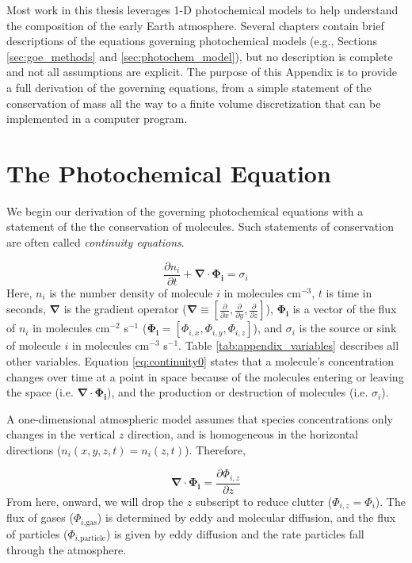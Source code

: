 
Most work in this thesis leverages 1-D photochemical models to help understand the composition of the early Earth atmosphere. Several chapters contain brief descriptions of the equations governing photochemical models (e.g., Sections \ref{sec:goe_methods} and \ref{sec:photochem_model}), but no description is complete and not all assumptions are explicit. The purpose of this Appendix is to provide a full derivation of the governing equations, from a simple statement of the conservation of mass all the way to a finite volume discretization that can be implemented in a computer program.

\section{The Photochemical Equation} \label{sec:photochem_eqn}

We begin our derivation of the governing photochemical equations with a statement of the the conservation of molecules. Such statements of conservation are often called \emph{continuity equations}.

\begin{equation} \label{eq:continuity0}
  \frac{\partial n_{i}}{\partial t} + \bm{\nabla} \cdot \bm{\Phi_{i}} = \sigma_i
\end{equation}
Here, $n_i$ is the number density of molecule $i$ in molecules cm$^{-3}$, $t$ is time in seconds, $\bm{\nabla}$ is the gradient operator ($\bm{\nabla} \equiv [\frac{\partial}{\partial x}, \frac{\partial}{\partial y}, \frac{\partial}{\partial z}]$), $\bm{\Phi_{i}}$ is a vector of the flux of $n_i$ in molecules cm$^{-2}$ s$^{-1}$ ($\bm{\Phi_{i}} = [\Phi_{i,x},\Phi_{i,y},\Phi_{i,z}]$), and $\sigma_i$ is the source or sink of molecule $i$ in molecules cm$^{-3}$ s$^{-1}$. Table \ref{tab:appendix_variables} describes all other variables. Equation \eqref{eq:continuity0} states that a molecule's concentration changes over time at a point in space because of the molecules entering or leaving the space (i.e. $\bm{\nabla} \cdot \bm{\Phi_{i}}$), and the production or destruction of molecules (i.e. $\sigma_i$). 

A one-dimensional atmospheric model assumes that species concentrations only changes in the vertical $z$ direction, and is homogeneous in the horizontal directions ($n_i(x,y,z,t) = n_i(z,t)$). Therefore,

\begin{equation} \label{eq:1D_flux}
  \bm{\nabla} \cdot \bm{\Phi_{i}} = \frac{\partial \Phi_{i,z}}{\partial z}
\end{equation}
From here, onward, we will drop the $z$ subscript to reduce clutter ($\Phi_{i,z} = \Phi_{i}$). The flux of gases ($\Phi_{i\text{,gas}}$) is determined by eddy and molecular diffusion, and the flux of particles ($\Phi_{i\text{,particle}}$) is given by eddy diffusion and the rate particles fall through the atmosphere.

